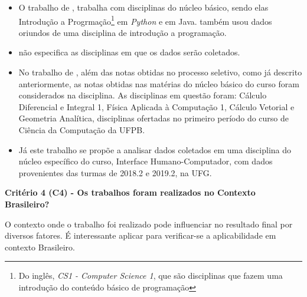 \documentclass[
	12pt,				%
	openright,			%
	oneside,
	a4paper,			%
	english,			%
	french,				%
	spanish,			%
	brazil,				%
	]{abntex2}
\begin{document}
\begin{itemize}
    \item O trabalho de , trabalha com disciplinas do núcleo básico, sendo elas Introdução a Progrmação\footnote[4]{Do inglês, \textit{CS1 - Computer Science 1}, que são disciplinas que fazem uma introdução do conteúdo básico de programação} em \textit{Python} e em Java.  também usou dados oriundos de uma disciplina de introdução a programação.
    \item {} não especifica as disciplinas em que os dados serão coletados.
    \item No trabalho de , além das notas obtidas no processo seletivo, como já descrito anteriormente, as notas obtidas nas matérias do núcleo básico do curso foram considerados na disciplina. As disciplinas em questão foram: Cálculo Diferencial e Integral 1, Física Aplicada à Computação 1, Cálculo Vetorial e Geometria Analítica, disciplinas ofertadas no primeiro período do curso de Ciência da Computação da UFPB.
    \item Já este trabalho se propõe a analisar dados coletados em uma disciplina do núcleo específico do curso, Interface Humano-Computador, com dados provenientes das turmas de 2018.2 e 2019.2, na UFG.
\end{itemize}

\textbf{Critério 4 (C4) - Os trabalhos foram realizados no Contexto Brasileiro?}

O contexto onde o trabalho foi realizado pode influenciar no resultado final por diversos fatores. É interessante aplicar para verificar-se a aplicabilidade em contexto Brasileiro.
\end{document}
